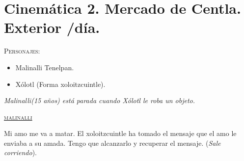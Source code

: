 \documentclass[11pt,letterpaper]{article}
\begin{document}
\section{Cinemática 2. Mercado de Centla. Exterior /día.}
\textsc{Personajes}:
\begin{itemize}
	\item Malinalli Tenelpan.
	\item Xólotl (Forma xoloitzcuintle).
\end{itemize}

\textit{Malinalli(15 años) está parada cuando Xólotl le roba un objeto.}
\begin{center}
\textsc{\underline{malinalli}}
\\
\par
Mi amo me va a matar. El xoloitzcuintle ha tomado el mensaje que el amo le enviaba a su amada. Tengo que alcanzarlo y recuperar el mensaje. (\textit{Sale corriendo}).
\end{center}
\end{document}
